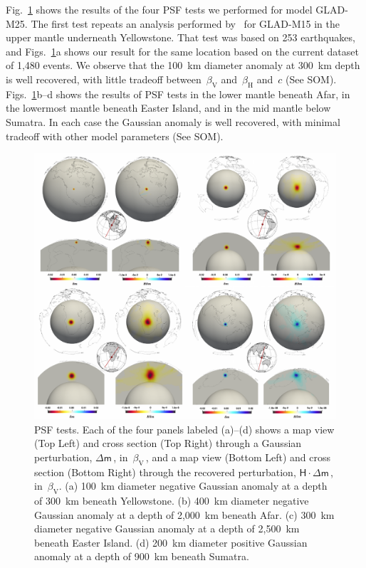 \documentclass[extra,mreferee]{gji}
\begin{document}
Fig.~\ref{fig:psf_tests} shows the results of the four PSF tests we performed for model GLAD-M25.
The first test repeats an analysis performed by~\cite{bozdaug2016global} for GLAD-M15 in the upper mantle underneath Yellowstone.
That test was based on 253 earthquakes,
and Figs.~\ref{fig:psf_tests}a shows our result for the same location based on the current dataset of 1,480 events.
We observe that the 100~km diameter anomaly at 300~km depth is well recovered, with little tradeoff between~$\beta_\mathrm{V}$ and~$\beta_\mathrm{H}$ and~$c$ (See SOM).
Figs.~\ref{fig:psf_tests}b--d shows the results of PSF tests in the lower mantle beneath Afar,
in the lowermost mantle beneath Easter Island,
and in the mid mantle below Sumatra.
In each case the Gaussian anomaly is well recovered, with minimal tradeoff with other model parameters (See SOM).

\begin{figure}
  \centering
  \includegraphics[width=\textwidth]{figures/psf/psf_tests.pdf}
  \caption{\small{PSF tests.
  Each of the four panels labeled (a)--(d) shows a map view (Top Left) and cross section (Top Right) through a Gaussian perturbation, $\mathsf{\Delta}\mathsf{m}$\,, in~$\beta_\mathrm{V}$\,,
  and a map view (Bottom Left) and cross section (Bottom Right) through the recovered perturbation, $\mathsf{H}\cdot\mathsf{\Delta}\mathsf{m}$\,, in~$\beta_\mathrm{V}$.
  (a) 100~km diameter negative Gaussian anomaly at a depth of 300~km beneath Yellowstone.
  (b) 400~km diameter negative Gaussian anomaly at a depth of 2,000~km beneath Afar.
  (c) 300~km diameter negative Gaussian anomaly at a depth of 2,500~km beneath Easter Island.
  (d) 200~km diameter positive Gaussian anomaly at a depth of 900~km beneath Sumatra.
  }}
  \label{fig:psf_tests}
\end{figure}
\end{document}
